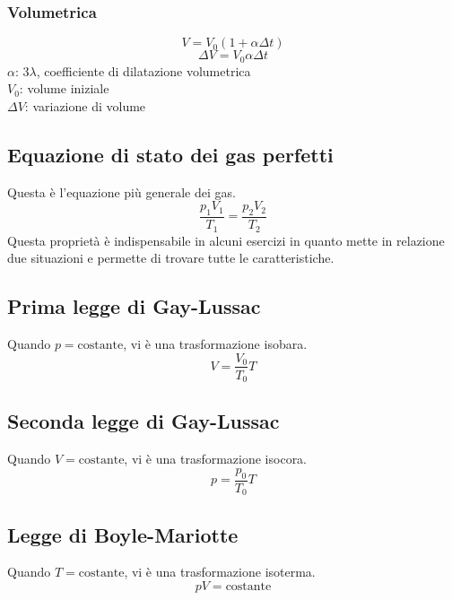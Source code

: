 \subsubsection{Volumetrica}
\begin{equation*}
  V = V_0\left(1+\alpha\Delta t\right)
\end{equation*}
\begin{equation*}
  \Delta V = V_0\alpha\Delta t
\end{equation*}
$\alpha$: $3\lambda$, coefficiente di dilatazione volumetrica\\
$V_0$: volume iniziale\\
$\Delta V$: variazione di volume

\subsection{Equazione di stato dei gas perfetti}
Questa è l'equazione più generale dei gas.
\begin{equation*}
  \frac{p_1V_1}{T_1} = \frac{p_2V_2}{T_2}
\end{equation*}
Questa proprietà è indispensabile in alcuni esercizi in quanto mette in relazione due situazioni e
permette di trovare tutte le caratteristiche.

\subsection{Prima legge di Gay-Lussac}
Quando $p = \text{costante}$, vi è una trasformazione isobara.
\begin{equation*}
  V = \frac{V_0}{T_0}T
\end{equation*}

\subsection{Seconda legge di Gay-Lussac}
Quando $V = \text{costante}$, vi è una trasformazione isocora.
\begin{equation*}
  p = \frac{p_0}{T_0}T
\end{equation*}

\subsection{Legge di Boyle-Mariotte}
Quando $T = \text{costante}$, vi è una trasformazione isoterma.
\begin{equation*}
  pV = \text{costante}
\end{equation*}

